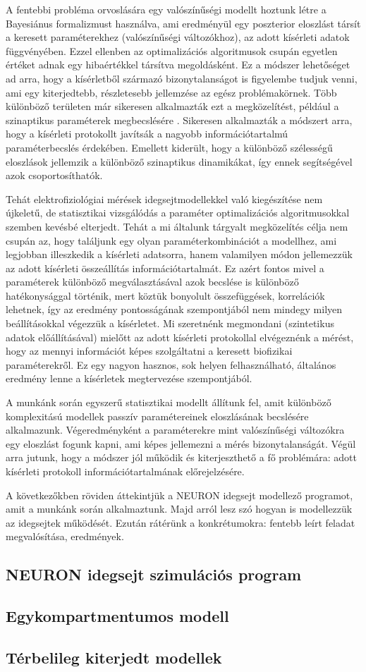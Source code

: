 A fentebbi probléma orvoslására egy valószínűségi modellt hoztunk létre a Bayesiánus formalizmust használva, ami eredményül egy poszterior eloszlást társít a keresett paraméterekhez (valószínűségi változókhoz), az adott kísérleti adatok függvényében. Ezzel ellenben az optimalizációs algoritmusok csupán egyetlen értéket adnak egy hibaértékkel társítva megoldásként. Ez a módszer lehetőséget ad arra, hogy a kísérletből származó bizonytalanságot is figyelembe tudjuk venni, ami egy kiterjedtebb, részletesebb jellemzése az egész problémakörnek. Több különböző területen már sikeresen alkalmazták ezt a megközelítést, például a szinaptikus paraméterek megbecslésére \cite{costa2013probabilistic}. Sikeresen alkalmazták a módszert arra, hogy a kísérleti protokollt javítsák a nagyobb információtartalmú paraméterbecslés érdekében. Emellett kiderült, hogy a különböző szélességű eloszlások jellemzik a különböző szinaptikus dinamikákat, így ennek segítségével azok csoportosíthatók. 


Tehát elektrofiziológiai mérések idegsejtmodellekkel való kiegészítése nem újkeletű, de statisztikai vizsgálódás a paraméter optimalizációs algoritmusokkal szemben kevésbé elterjedt. Tehát a mi általunk tárgyalt megközelítés célja nem csupán az, hogy találjunk egy olyan paraméterkombinációt a modellhez, ami legjobban illeszkedik a kísérleti adatsorra, hanem valamilyen módon jellemezzük az adott kísérleti összeállítás információtartalmát. Ez azért fontos mivel a paraméterek különböző megválasztásával azok becslése is különböző hatékonysággal történik, mert köztük bonyolult összefüggések, korrelációk lehetnek, így az eredmény pontosságának szempontjából nem mindegy milyen beállításokkal végezzük a kísérletet. Mi szeretnénk megmondani (szintetikus adatok előállításával) mielőtt az adott kísérleti protokollal elvégeznénk a mérést, hogy az mennyi információt képes szolgáltatni a keresett biofizikai paraméterekről. Ez egy nagyon hasznos, sok helyen felhasználható, általános eredmény lenne a kísérletek megtervezése szempontjából.


A munkánk során egyszerű statisztikai modellt állítunk fel, amit különböző komplexitású modellek passzív paramétereinek eloszlásának becslésére alkalmazunk. Végeredményként a paraméterekre mint valószínűségi változókra egy eloszlást fogunk kapni, ami képes jellemezni a mérés bizonytalanságát. Végül arra jutunk, hogy a módszer jól működik és kiterjeszthető a fő problémára: adott kísérleti protokoll információtartalmának előrejelzésére.


A következőkben röviden áttekintjük a NEURON idegsejt modellező programot, amit a munkánk során alkalmaztunk. Majd arról lesz szó hogyan is modellezzük az idegsejtek működését. Ezután rátérünk a konkrétumokra: fentebb leírt feladat megvalósítása, eredmények.


\subsection{NEURON idegsejt szimulációs program}

\subsection{Egykompartmentumos modell}

\subsection{Térbelileg kiterjedt modellek}
